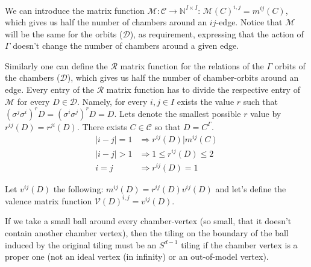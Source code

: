 \documentclass[12pt,a4paper]{article}
\theoremstyle{plain}%
\theoremstyle{definition}
\theoremstyle{remark}
\begin{document}
We can introduce the matrix function $\mathcal{M}: \mathcal{C}
\rightarrow \mathbb{N}^{I\times I}$: $\mathcal{M}(C)^{i,j}=m^{ij}(C)$, which
gives us half the number of chambers around an $ij$-edge. Notice that $\mathcal{M}$
will be the same for the orbits ($\mathcal{D}$), as requirement, expressing that
the action of $\Gamma$ doesn't change the number of chambers around a given
edge.

Similarly one can define the $\mathcal{R}$ matrix function for the
relations of the $\Gamma$ orbits of the chambers ($\mathcal{D}$), which gives us
half the number of chamber-orbits around an edge. Every entry of the $\mathcal{R}$
matrix function has to divide the respective entry of $\mathcal{M}$ for
every $D\in\mathcal{D}$. Namely, for every $i,j\in I$ exists the value $r$ such that
$(\sigma^j\sigma^i)^rD=(\sigma^i\sigma^j)^rD=D$. Lets denote the smallest
possible $r$ value by $r^{ij}(D)=r^{ji}(D)$. There exists $C\in\mathcal{C}$ so
that $D=C^\Gamma$.
\begin{align}
  |i-j|=1 & \Rightarrow r^{ij}(D)|m^{ij}(C) \\
  |i-j|>1 & \Rightarrow 1\leq r^{ij}(D)\leq 2 \\
  i=j & \Rightarrow r^{ij}(D)=1
\end{align}

Let $v^{ij}(D)$ the following: $m^{ij}(D)=r^{ij}(D)v^{ij}(D)$ and
let's define the valence matrix function
$\mathcal{V}(D)^{i,j}=v^{ij}(D)$.


If we take a small ball around every chamber-vertex (so small, that it doesn't
contain another chamber vertex), then the tiling on the boundary of the ball
induced by the original tiling must be an $S^{d-1}$ tiling \cite{D87} if the
chamber vertex is a proper one (not an ideal vertex (in infinity) or an
out-of-model vertex).
\end{document}
